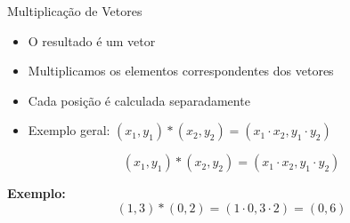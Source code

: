\documentclass{beamer}
\begin{document}
\begin{frame}{Multiplicação de Vetores}


\vspace{0.5cm}

\begin{itemize}
    \item O resultado é um vetor
    \item Multiplicamos os elementos correspondentes dos vetores
    \item Cada posição é calculada separadamente
    \item Exemplo geral: $(x_1, y_1) * (x_2, y_2) = (x_1 \cdot x_2, y_1 \cdot y_2)$
\end{itemize}

\vspace{0.5cm}

\[
(x_1, y_1) * (x_2, y_2) = (x_1 \cdot x_2, y_1 \cdot y_2)
\]

\vspace{0.5cm}

\textbf{Exemplo:}
\[
(1,3) * (0,2) = (1 \cdot 0, 3 \cdot 2) = (0,6)
\]

\end{frame}
\end{document}
